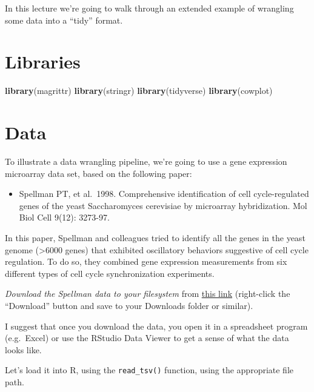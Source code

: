 \documentclass[]{book}
\newenvironment{Shaded}{\begin{snugshade}}{\end{snugshade}}
\newcommand{\KeywordTok}[1]{\textcolor[rgb]{0.13,0.29,0.53}{\textbf{#1}}}
\newcommand{\NormalTok}[1]{#1}
\providecommand{\tightlist}{%
  \setlength{\itemsep}{0pt}\setlength{\parskip}{0pt}}
\theoremstyle{definition}
\theoremstyle{definition}
\theoremstyle{definition}
\theoremstyle{remark}
\begin{document}
In this lecture we're going to walk through an extended example of
wrangling some data into a ``tidy'' format.

\hypertarget{libraries-2}{%
\section{Libraries}\label{libraries-2}}

\begin{Shaded}
\begin{Highlighting}[]
\KeywordTok{library}\NormalTok{(magrittr)}
\KeywordTok{library}\NormalTok{(stringr)}
\KeywordTok{library}\NormalTok{(tidyverse)}
\KeywordTok{library}\NormalTok{(cowplot)}
\end{Highlighting}
\end{Shaded}

\hypertarget{data}{%
\section{Data}\label{data}}

To illustrate a data wrangling pipeline, we're going to use a gene
expression microarray data set, based on the following paper:

\begin{itemize}
\tightlist
\item
  Spellman PT, et al.~1998. Comprehensive identification of cell
  cycle-regulated genes of the yeast Saccharomyces cerevisiae by
  microarray hybridization. Mol Biol Cell 9(12): 3273-97.
\end{itemize}

In this paper, Spellman and colleagues tried to identify all the genes
in the yeast genome (\textgreater{}6000 genes) that exhibited
oscillatory behaviors suggestive of cell cycle regulation. To do so,
they combined gene expression measurements from six different types of
cell cycle synchronization experiments.

\emph{Download the Spellman data to your filesystem} from
\href{https://github.com/bio304-class/bio304-course-notes/raw/master/datasets/spellman-combined.txt}{this
link} (right-click the ``Download'' button and save to your Downloads
folder or similar).

I suggest that once you download the data, you open it in a spreadsheet
program (e.g.~Excel) or use the RStudio Data Viewer to get a sense of
what the data looks like.

Let's load it into R, using the \texttt{read\_tsv()} function, using the
appropriate file path.
\end{document}
